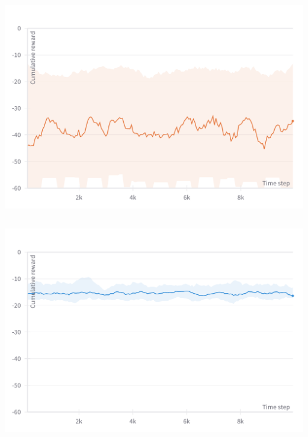 \documentclass[
  letterpaper,
  DIV=11,
  numbers=noendperiod,
  oneside]{scrartcl}
\begin{document}
\subsection{}\label{section-41}

\includegraphics{figs/reward-badmodel-n10.png}

\subsection{}\label{section-42}

\includegraphics{figs/reward-goodmodel-n10.png}

\subsection{}\label{section-43}
\end{document}
